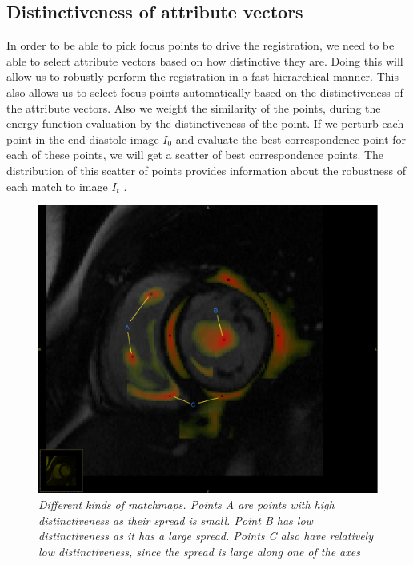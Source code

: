 \subsection {Distinctiveness of attribute vectors}
\label{sec:wav-distinctive}
In order to be able to pick focus points to drive the registration, we need to be able to select attribute vectors based on how distinctive they are. Doing this will allow us to robustly perform the registration in a fast hierarchical manner. This also allows us to select focus points automatically based on the distinctiveness of the attribute vectors. Also we weight the similarity of the points, during the energy function evaluation by the distinctiveness of the point. If we perturb each point in the end-diastole image $I_0$ and evaluate the best correspondence point for each of these points, we will get a scatter of best correspondence points. The distribution of this scatter of points provides information about the robustness of each match to image $I_t$ \cite{guest01}. 

\begin{figure}
\begin{center}
\includegraphics[scale=0.25]{images/dist_explain.png} 
\caption{\em \small Different kinds of matchmaps. Points A are points with high distinctiveness as their spread is small. Point B has low distinctiveness as it has a large spread. Points C also have relatively low distinctiveness, since the spread is large along one of the axes}
\label{dist-exp}
\end{center}  
\end{figure}

